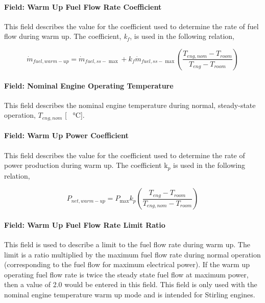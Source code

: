 \paragraph{Field: Warm Up Fuel Flow Rate Coefficient}\label{field-warm-up-fuel-flow-rate-coefficient}

This field describes the value for the coefficient used to determine the rate of fuel flow during warm up. The coefficient, \emph{k\(_{f}\)}, is used in the following relation,

\begin{equation}
{\dot m_{fuel,warm - up}} = {\dot m_{fuel,ss - \max }} + {k_f}{\dot m_{fuel,ss - \max }}\left( {\frac{{{T_{eng,nom}} - {T_{room}}}}{{{T_{eng}} - {T_{room}}}}} \right)
\end{equation}

\paragraph{Field: Nominal Engine Operating Temperature}\label{field-nominal-engine-operating-temperature}

This field describes the nominal engine temperature during normal, steady-state operation, \({T_{eng,nom}}\) {[} \SI{}{\celsius}{]}.

\paragraph{Field: Warm Up Power Coefficient}\label{field-warm-up-power-coefficient}

This field describes the value for the coefficient used to determine the rate of power production during warm up. The coefficient k\(_{p}\) is used in the following relation,

\begin{equation}
{P_{net,warm - up}} = {P_{\max }}{k_p}\left( {\frac{{{T_{eng}} - {T_{room}}}}{{{T_{eng,nom}} - {T_{room}}}}} \right)
\end{equation}

\paragraph{Field: Warm Up Fuel Flow Rate Limit Ratio}\label{field-warm-up-fuel-flow-rate-limit-ratio}

This field is used to describe a limit to the fuel flow rate during warm up. The limit is a ratio multiplied by the maximum fuel flow rate during normal operation (corresponding to the fuel flow for maximum electrical power). If the warm up operating fuel flow rate is twice the steady state fuel flow at maximum power, then a value of 2.0 would be entered in this field. This field is only used with the nominal engine temperature warm up mode and is intended for Stirling engines.

